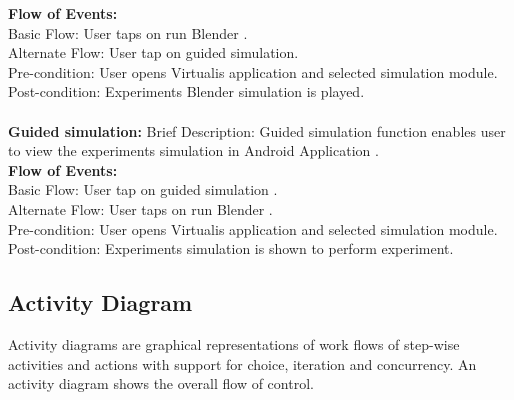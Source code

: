 \documentclass[12pt]{report}
\begin{document}
\textbf{Flow of Events: }\\
\indent	 Basic Flow: User taps on run Blender . \\
\indent	Alternate Flow: User  tap on guided simulation. \\
Pre-condition: User opens Virtualis application and selected simulation module. \\
Post-condition: Experiments Blender simulation is played.
\\
\\
\textbf{Guided simulation: }
Brief Description: Guided simulation function enables user to  view the experiments simulation in Android Application . \\
\textbf{Flow of Events: }\\
\indent	 Basic Flow: User  tap on guided simulation . \\
\indent	Alternate Flow:  User taps on run Blender .\\
Pre-condition: User opens Virtualis application and selected simulation module.\\ 
Post-condition: Experiments simulation is shown to perform experiment.\\

\pagebreak

\subsection{Activity Diagram}

Activity diagrams are graphical representations of work flows of step-wise activities 
and actions with support for choice, iteration and concurrency. An activity diagram 
shows the overall flow of control. 
\end{document}
